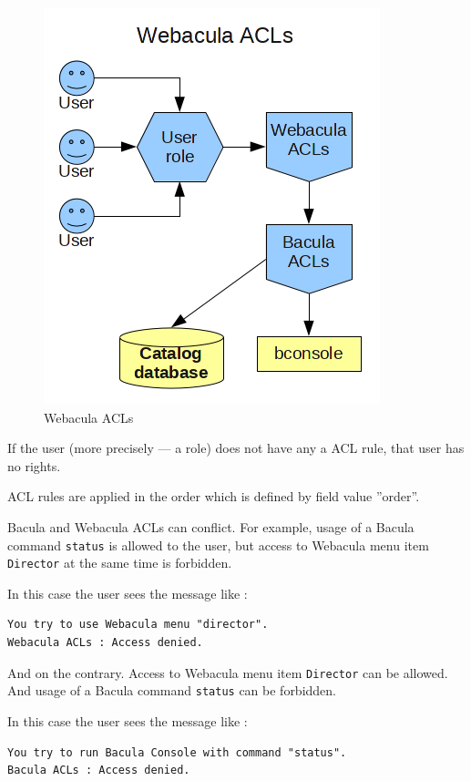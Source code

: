 \documentclass[10pt]{article}
\begin{document}
\begin{figure}[htp]
  \centering
  \includegraphics[totalheight=0.45\textheight,keepaspectratio=true]{./pics/ACLs.png}
  \caption[Webacula ACLs]{Webacula ACLs}
  \label{Webacula ACLs}
\end{figure}

If the user (more precisely --- a role) does not have any a ACL rule, that user has no rights.

ACL rules are applied in the order which is defined by field value ''order''.

Bacula and Webacula ACLs can conflict.
For example, usage of a Bacula command \texttt{status} is allowed to the user, 
but access to Webacula menu item \texttt{Director} at the same time is forbidden.

In this case the user sees the message like :
\begin{verbatim}
You try to use Webacula menu "director".
Webacula ACLs : Access denied.
\end{verbatim}

And on the contrary.
Access to Webacula menu item \texttt{Director} can be allowed. And usage of a Bacula command \texttt{status} can be forbidden.

In this case the user sees the message like :
\begin{verbatim}
You try to run Bacula Console with command "status".
Bacula ACLs : Access denied.
\end{verbatim}
\end{document}
